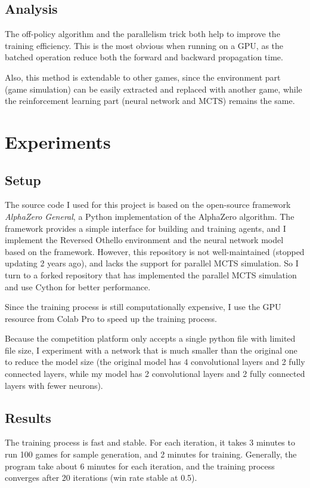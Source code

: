 \documentclass[conference]{IEEEtran}
\begin{document}
\subsection{Analysis}

The off-policy algorithm and the parallelism trick both help to improve the training efficiency.
This is the most obvious when running on a GPU, as the batched operation reduce both the forward and backward propagation time.

Also, this method is extendable to other games, since the environment part (game simulation) can be easily extracted and replaced with another game, while the reinforcement learning part (neural network and MCTS) remains the same.

\section{Experiments}

\subsection{Setup}
The source code I used for this project is based on the open-source framework \textit{AlphaZero General}\cite{thakoor2016learning}, a Python implementation of the AlphaZero algorithm.
The framework provides a simple interface for building and training agents, and I implement the Reversed Othello environment and the neural network model based on the framework.
However, this repository is not well-maintained (stopped updating 2 years ago), and lacks the support for parallel MCTS simulation.
So I turn to a forked repository\cite{Bobingstern} that has implemented the parallel MCTS simulation and use Cython for better performance.

Since the training process is still computationally expensive, I use the GPU resource from Colab Pro to speed up the training process.

Because the competition platform only accepts a single python file with limited file size, I experiment with a network that is much smaller than the original one to reduce the model size (the original model has 4 convolutional layers and 2 fully connected layers, while my model has 2 convolutional layers and 2 fully connected layers with fewer neurons).

\subsection{Results}
The training process is fast and stable.
For each iteration, it takes 3 minutes to run 100 games for sample generation, and 2 minutes for training.
Generally, the program take about 6 minutes for each iteration, and the training process converges after 20 iterations (win rate stable at 0.5).
\end{document}
